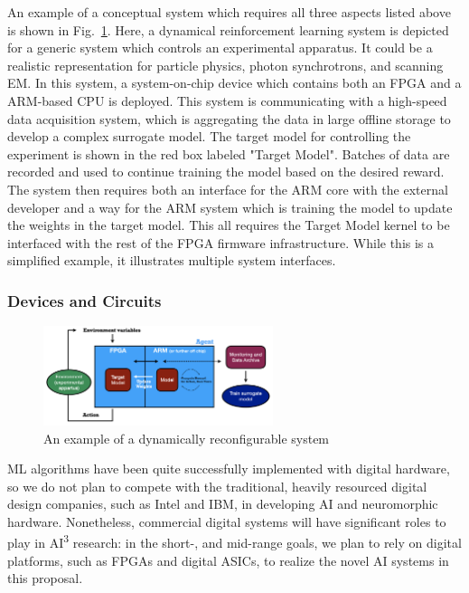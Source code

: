 
An example of a conceptual system which requires all three aspects listed above is shown in Fig.~\ref{fig:reinforce}.
Here, a dynamical reinforcement learning system is depicted for a generic system which controls an experimental apparatus. It could be a realistic representation for particle physics, photon synchrotrons, and scanning EM.
In this system, a system-on-chip device which contains both an FPGA and a ARM-based CPU is deployed.  This system is communicating with a high-speed data acquisition system, which is aggregating the data in large offline storage to develop a complex surrogate model.  The target model for controlling the experiment is shown in the red box labeled "Target Model".  Batches of data are recorded and used to continue training the model based on the desired reward.  The system then requires both an interface for the ARM core with the external developer and a way for the ARM system which is training the model to update the weights in the target model.  This all requires the Target Model kernel to be interfaced with the rest of the FPGA firmware infrastructure. While this is a simplified example, it illustrates multiple system interfaces.


\subsubsection{Devices and Circuits} \label{sec:circuits}
\begin{figure}
\centering
\vskip-20pt
  \includegraphics[keepaspectratio, width=0.6\textwidth]{proposal/img/reconfigurableArch.png}
  \caption{An example of a dynamically reconfigurable system}
  \label{fig:reinforce}
\vskip-10pt
\end{figure}
ML algorithms have been quite successfully implemented with digital hardware, so we do not plan to compete with the traditional, heavily resourced digital design companies, such as Intel and IBM, in developing AI and neuromorphic hardware. Nonetheless, commercial digital systems will have significant roles to play in AI\textsuperscript{3} research: in the short-, and mid-range goals, we plan to rely on digital platforms, such as FPGAs and digital ASICs, to realize the novel AI systems in this proposal. 

